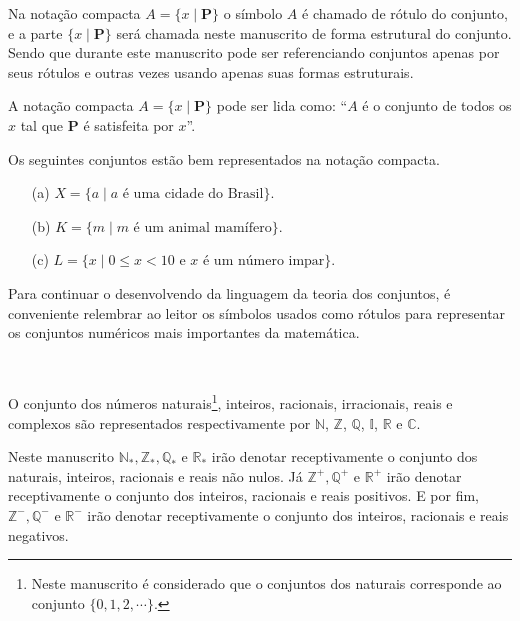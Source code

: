 \begin{rema}
	Na notação compacta $A = \{ x \mid \textbf{P}\}$ o símbolo $A$ é chamado de rótulo do conjunto, e a parte $\{ x \mid \textbf{P}\}$ será chamada neste manuscrito de forma estrutural do conjunto. Sendo que durante este manuscrito pode ser referenciando conjuntos apenas por seus rótulos e outras vezes usando apenas suas formas estruturais.
\end{rema}

\begin{rema}
	A notação compacta $A = \{ x \mid \textbf{P}\}$ pode ser lida como: ``$A$ é o conjunto de todos os $x$ tal que $\textbf{P}$ é satisfeita por $x$''.
\end{rema}

\begin{exem}\label{exe:conjuntos}
	Os seguintes conjuntos estão bem representados na notação compacta.
	\begin{itemize}
		\item[(a)] $X = \{a \mid a \mbox{ é uma cidade do Brasil}\}$.
		\item[(b)] $K = \{m \mid m \mbox{ é um animal mamífero}\}$.
		\item[(c)] $L = \{x \mid 0 \leq x < 10 \mbox{ e } x \mbox{ é um número impar}\}$.
	\end{itemize}
\end{exem}

Para continuar o desenvolvendo da linguagem da teoria dos conjuntos, é conveniente relembrar ao leitor os símbolos usados como rótulos para representar os conjuntos numéricos mais importantes da matemática.

\

\begin{definition}\label{def:SimbolosConjuntos}
	O conjunto dos números naturais\footnote{Neste manuscrito é considerado que o conjuntos dos naturais corresponde ao conjunto $\{0, 1, 2, \cdots\}$.}, inteiros, racionais, irracionais, reais e complexos são representados respectivamente por   $\mathbb{N}$, $\mathbb{Z}$,  $\mathbb{Q}$,  $\mathbb{I}$,  $\mathbb{R}$ e  $\mathbb{C}$.
\end{definition}

\begin{rema}
	Neste manuscrito $\mathbb{N}_*, \mathbb{Z}_*, \mathbb{Q}_*$ e $\mathbb{R}_*$ irão denotar receptivamente o conjunto dos naturais, inteiros, racionais e reais não nulos. Já $\mathbb{Z}^+, \mathbb{Q}^+$ e $\mathbb{R}^+$ irão denotar receptivamente o conjunto dos inteiros, racionais e reais positivos. E por fim, $\mathbb{Z}^-, \mathbb{Q}^-$ e $\mathbb{R}^-$ irão denotar receptivamente o conjunto dos inteiros, racionais e reais negativos.
\end{rema}

